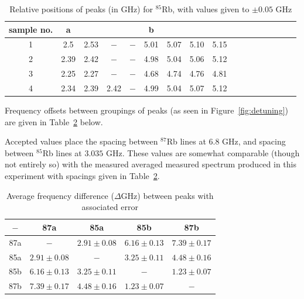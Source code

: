 \documentclass[paper=a4, fontsize=11pt]{scrartcl} %
\numberwithin{equation}{section}
\numberwithin{figure}{section}
\numberwithin{table}{section}
\begin{document}
\begin{table}[H]
\centering
\caption{Relative positions of peaks (in GHz) for $^{85}$Rb, with values given to $\pm 0.05$ GHz}
\begin{tabular}{ c | c c c c | c c c c | c c c c | c c c c }
  \hline
  \hline
  sample no. & a & & & & b  \\
  \hline
  1 & 2.5 & 2.53 & $-$ & $-$ & 5.01 & 5.07 & 5.10 & 5.15 \\
  2 & 2.39 & 2.42 & $-$ & $-$ & 4.98 & 5.04 & 5.06 & 5.12 \\
  3 & 2.25 & 2.27 & $-$ & $-$ & 4.68 & 4.74 & 4.76 & 4.81 \\
  4 & 2.34 & 2.39 & 2.42 & $-$ & 4.99 & 5.04 & 5.07 & 5.12 
\end{tabular}
\label{table:relativePositions85}
\end{table}

Frequency offsets between groupings of peaks (as seen in Figure~\ref{fig:detuning}) are given in Table~\ref{table:freqOffset} below.

Accepted values place the spacing between $^{87}$Rb lines at $6.8$ GHz, and spacing between $^{85}$Rb lines at $3.035$ GHz. These values are somewhat comparable (though not entirely so) with the measured averaged measured spectrum produced in this experiment with spacings given in Table~\ref{table:freqOffset}.

\begin{table}[H]
\centering
\caption{Average frequency difference ($\Delta$GHz) between peaks with associated error}
\begin{tabular}{ || c | c c c c || }
  \hline
  \hline
   $-$ & 87a & 85a & 85b & 87b \\
  \hline
  87a & $-$ & $2.91 \pm 0.08$ & $6.16 \pm 0.13$ & $7.39 \pm 0.17$ \\
  85a & $2.91 \pm 0.08$ & $-$ & $3.25 \pm 0.11$ & $4.48 \pm 0.16$ \\
  85b & $6.16 \pm 0.13$ & $3.25 \pm 0.11$ & $-$ &  $1.23 \pm 0.07$ \\
  87b & $7.39 \pm 0.17$ & $4.48 \pm 0.16$ & $1.23 \pm 0.07$ & $-$  \\
  \hline
  \hline
\end{tabular}
\label{table:freqOffset}
\end{table}
\end{document}
